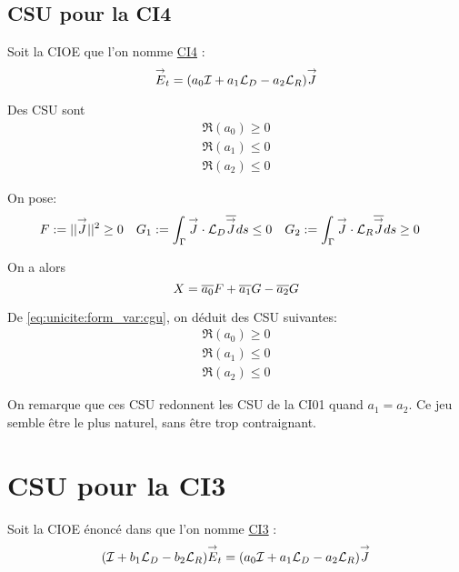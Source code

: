 \subsection{CSU pour la CI4}
  Soit la CIOE que l'on nomme \hyperlink{ci4}{CI4} :
  \begin{equation}
    \label{eq:unicite:ci4:ci4}
    {\overset{\rightarrow}{E}}_t = (a_0{\mathcal{I}} + a_1 {\mathcal{L}_D} - a_2 {\mathcal{L}_R} ) {\overset{\rightarrow}{J}}
  \end{equation}

  \begin{prop}
    Des CSU sont
    \begin{align}
      \Re(a_0) \ge 0
      \\
      \Re(a_1) \le 0
      \\
      \Re(a_2) \le 0
    \end{align}
  \end{prop}

  \begin{prop}
    On pose:
    \begin{align*}
      F &:= ||{\overset{\rightarrow}{J}}|| ^2 \ge 0  & G_1 &:= \int_\Gamma {\overset{\rightarrow}{J}}\cdot {\mathcal{L}_D}{\overline{{\overset{\rightarrow}{J}}}} ds \le 0 & G_2 &:= \int_\Gamma {\overset{\rightarrow}{J}}\cdot {\mathcal{L}_R}{\overline{{\overset{\rightarrow}{J}}}} ds \ge 0
    \end{align*}

    On a alors
    \begin{equation*}
      X = {\overline{a_0}}F + {\overline{a_1}}G - {\overline{a_2}}G
    \end{equation*}

    De \eqref{eq:unicite:form_var:cgu}, on déduit des CSU suivantes:
    \begin{align}
      \Re\left(a_0\right) \ge 0
      \\
      \Re\left(a_1\right) \le 0
      \\
      \Re\left(a_2\right) \le 0
    \end{align}
  \end{prop}

  On remarque que ces CSU redonnent les CSU de la CI01 quand \(a_1=a_2\). Ce jeu semble être le plus naturel, sans être trop contraignant.

\section{CSU pour la CI3}

  Soit la CIOE énoncé dans \cite{aubakirov_electromagnetic_2014} que l'on nomme \hyperlink{ci3}{CI3} :
  \begin{equation}
    \label{eq:unicite:ci3:ci3}
    ( {\mathcal{I}} + b_1 {\mathcal{L}_D} - b_2 {\mathcal{L}_R}){\overset{\rightarrow}{E}}_t = (a_0{\mathcal{I}} + a_1 {\mathcal{L}_D} - a_2 {\mathcal{L}_R} ) {\overset{\rightarrow}{J}}
  \end{equation}


